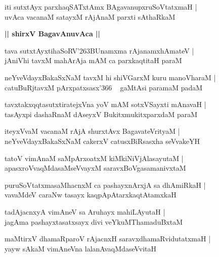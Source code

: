 \documentclass[twoside,12pt,openright]{book}
\def\S{\char'263}
\newcounter{shloka}[chapter]
\def\uvaca#1{\centerline{{\large\textbf{#1}}}}
\begin{document}
\begin{shloka}%
iti sutxtAyx parxhaqSATxtAmx BAgavanupxruSoVtatxmaH |\\
uvAca vacanaM satayxM rAjAnaM parxti sAthaRkaM 
\end{shloka}

\uvaca{|| shirxV BagavAnuvAca ||}

\begin{shloka}%
tava sutxtAyxtihaSoRV\S BUnamxma rAjanamxhAmateV |\\
jAniVhi tavxM mahArAja mAM ca parxkaqtitaH paraM
\end{shloka}

\begin{shloka}%
neYveVdayxBakaSxNaM tavxM hi shiVGarxM kuru manoVharaM |\\
catuBuRjtavxM pArxpatxsasx\char'366 ~ gaMtAsi paramaM padaM 
\end{shloka}

\begin{shloka}%
tavxtakxqqtasutxtiratejxVna yoV mAM sotxVSayxti mAnavaH |\\
tasAyxpi dashaRnaM dAseyxV BukitxmukitxparxdaM paraM 
\end{shloka}

\begin{shloka}%
iteyxVvaM vacanaM rAjA shurxtAvx BagavateVrityaM |\\
neYveVdayxBakaSxNaM cakerxV catusxBiRsasxha seVvakeYH 
\end{shloka}

\begin{shloka}%
tatoV vimAnaM saMpArxoatxM kiMkiNiVjAlasayutaM |\\
apasxroVvaqMdasaMseVvayxM saravxBoVgasamanivxtaM 
\end{shloka}

\begin{shloka}%
puruSoVtatxmasaMhacnxM ca pashayxnArxjA sa dhAmiRkaH |\\
vavaMdeV caraNw tasayx kaqpApAtarxkaqtAtamxkaH
\end{shloka}

\begin{shloka}%
tadAjacnxyA vimAneV sa Aruhayx mahiLAyutaH |\\
jagAma pashayxtasatxsayx divi veYkuMThamaduBxtaM 
\end{shloka}

\begin{shloka}%
maMtirxV dhamaRparoV rAjacnxH saravxdhamaRvidutatxmaH |\\
yayw sAkaM vimAneVna lalanAvaqMdaseVvitaH 
\end{shloka}
\end{document}
